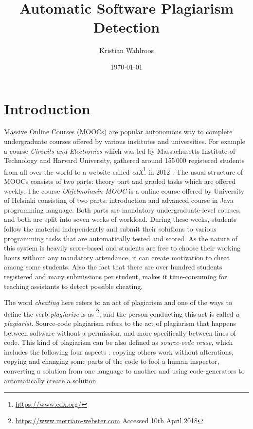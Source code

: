 \documentclass[english, grading]{tktltiki2}
\title{Automatic Software Plagiarism Detection}
\author{Kristian Wahlroos}
\date{\today}
\theoremstyle{definition}
\theoremstyle{remark}
\numberwithin{equation}{section} %
\begin{document}

\frontmatter      %

\maketitle        %
\makeabstract     %

\tableofcontents  %


\mainmatter       %

\section{Introduction}


Massive Online Courses (MOOCs) are popular autonomous way to complete undergraduate courses offered by various institutes and universities. For example a course \emph{Circuits and Electronics} which was led by Massachusetts Institute of Technology and Harvard University, gathered around 155\,000 registered students from all over the world to a website called \emph{edX}\footnote{\url{https://www.edx.org/}} in 2012 \cite{SLWCRFM2013}. The usual structure of MOOCs consists of two parts: theory part and graded tasks which are offered weekly. The course \emph{Ohjelmoinnin MOOC} is a online course offered by University of Helsinki consisting of two parts: introduction and advanced course in Java programming language. Both parts are mandatory undergraduate-level courses, and both are split into seven weeks of workload. During these weeks, students follow the material independently and submit their solutions to various programming tasks that are automatically tested and scored. As the nature of this system is heavily score-based and students are free to choose their working hours without any mandatory attendance, it can create motivation to cheat among some students. Also the fact that there are over hundred students registered and many submissions per student, makes it time-consuming for teaching assistants to detect possible cheating. 

The word \emph{cheating} here refers to an act of plagiarism and one of the ways to define the verb \emph{plagiarize} is as \footnote{\url{https://www.merriam-webster.com} Accessed 10th April 2018}, and the person conducting this act is called \emph{a plagiarist}. Source-code plagiarism refers to the act of plagiarism that happens between software without a permission, and more specifically between lines of code. This kind of plagiarism can be also defined as \emph{source-code reuse}, which includes the following four aspects \cite{TDSCP2008}: copying others work without alterations, copying and changing some parts of the code to fool a human inspector, converting a solution from one language to another and using code-generators to automatically create a solution. 
\end{document}
